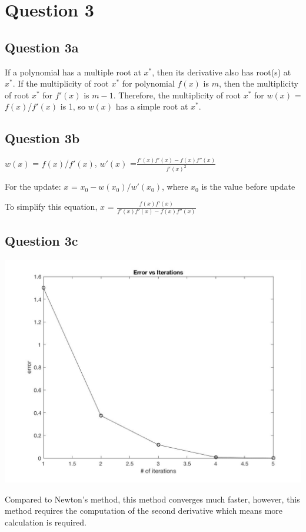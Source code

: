 \documentclass[11pt]{article} %
\begin{document}
\section{Question 3}
\subsection{Question 3a}
If a polynomial has a multiple root at $x^{*}$, then its derivative also has root(s) at $x^{*}$. If the multiplicity of root $x^{*}$ for polynomial $f(x)$ is $m$, then the multiplicity of root $x^{*}$ for $f'(x)$ is $m-1$. Therefore, the multiplicity of root $x^{*}$ for $w(x)$ = $f(x)$/$f'(x)$ is 1, so $w(x)$ has a simple root at $x^{*}$.
\subsection{Question 3b}
\centerline{$w(x)$ = $f(x)$/$f'(x)$, $w'(x)$ =$ \frac{f'(x)f'(x)-f(x)f''(x)}{f'(x)^2}$}\medskip
\centerline{For the update: $x$ = $x_{0} - w(x_{0})/w'(x_{0})$, where $x_{0}$ is the value before update}\medskip
\centerline{To simplify this equation, $x$ = $\frac{f(x)f'(x)}{f'(x)f'(x)-f(x)f''(x)}$}
\subsection{Question 3c}
\begin{center}
\includegraphics[scale = 0.35]{q33.jpg}\\\medskip
\end{center}
Compared to Newton's method, this method converges much faster, however, this method requires the computation of the second derivative which means more calculation is required.
\end{document}
